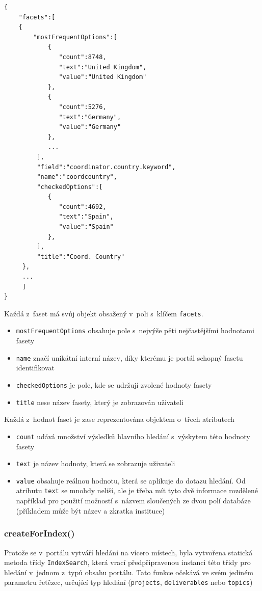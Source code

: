 \begin{verbatim}
{
    "facets":[
    {
        "mostFrequentOptions":[  
            {  
               "count":8748,
               "text":"United Kingdom",
               "value":"United Kingdom"
            },
            {  
               "count":5276,
               "text":"Germany",
               "value":"Germany"
            },
            ...
         ],
         "field":"coordinator.country.keyword",
         "name":"coordcountry",
         "checkedOptions":[  
            {  
               "count":4692,
               "text":"Spain",
               "value":"Spain"
            },
         ],
         "title":"Coord. Country"
     },
     ...
     ]
}
\end{verbatim}
Každá z~faset má svůj objekt obsažený v~poli s~klíčem \texttt{facets}.
\begin{itemize}
\item \texttt{mostFrequentOptions} obsahuje pole s~nejvýše pěti nejčastějšími hodnotami fasety
\item \texttt{name} značí unikátní interní název, díky kterému je portál schopný fasetu identifikovat
\item \texttt{checkedOptions} je pole, kde se udržují zvolené hodnoty fasety
\item \texttt{title} nese název fasety, který je zobrazován uživateli
\end{itemize}
Každá z~hodnot faset je zase reprezentována objektem o~třech atributech
\begin{itemize}
\item \texttt{count} udává množství výsledků hlavního hledání s~výskytem této hodnoty fasety
\item \texttt{text} je název hodnoty, která se zobrazuje uživateli
\item \texttt{value} obsahuje reálnou hodnotu, která se aplikuje do dotazu hledání. Od atributu \texttt{text} se mnohdy neliší, ale je třeba mít tyto dvě informace rozdělené například pro použití možností s~názvem sloučených ze dvou polí databáze (příkladem může být název a zkratka instituce)
\end{itemize}

\subsubsection*{createForIndex()}
Protože se v~portálu vytváří hledání na vícero místech, byla vytvořena statická metoda třídy \texttt{IndexSearch}, která vrací předpřipravenou instanci této třidy pro hledání v~jednom z~typů obsahu portálu. Tato funkce očekává ve svém jediném parametru řetězec, určující typ hledání (\texttt{projects}, \texttt{deliverables} nebo \texttt{topics})

